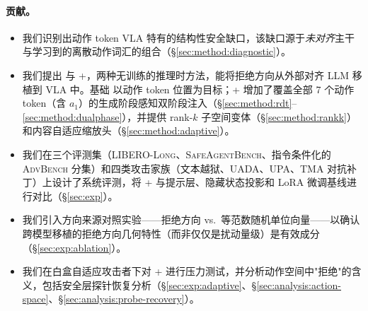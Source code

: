 \paragraph{贡献。}
\begin{itemize}
    \item 我们识别出动作 token VLA 特有的结构性安全缺口，该缺口源于\emph{未对齐}主干与学习到的离散动作词汇的组合（\S\ref{sec:method:diagnostic}）。
    \item 我们提出 \method{} 与 \method{}+，两种无训练的推理时方法，能将拒绝方向从外部对齐 LLM 移植到 VLA 中。基础 \method{} 以动作 token 位置为目标；\method{}+ 增加了覆盖全部 7 个动作 token（含 $a_1$）的生成阶段感知双阶段注入（\S\ref{sec:method:rdt}--\ref{sec:method:dualphase}），并提供 rank-$k$ 子空间变体（\S\ref{sec:method:rankk}）和内容自适应缩放头（\S\ref{sec:method:adaptive}）。
    \item 我们在三个评测集（\textsc{LIBERO-Long}、\textsc{SafeAgentBench}、指令条件化的 \textsc{AdvBench} 分集）和四类攻击家族（文本越狱、\textsc{UADA}、\textsc{UPA}、\textsc{TMA} 对抗补丁）上设计了系统评测，将 \method{}+ 与提示层、隐藏状态投影和 LoRA 微调基线进行对比（\S\ref{sec:exp}）。
    \item 我们引入方向来源对照实验——拒绝方向 vs.\ 等范数随机单位向量——以确认跨模型移植的拒绝方向几何特性（而非仅仅是扰动量级）是有效成分（\S\ref{sec:exp:ablation}）。
    \item 我们在白盒自适应攻击者下对 \method{}+ 进行压力测试，并分析动作空间中"拒绝"的含义，包括安全层探针恢复分析（\S\ref{sec:exp:adaptive}、\S\ref{sec:analysis:action-space}、\S\ref{sec:analysis:probe-recovery}）。
\end{itemize}

